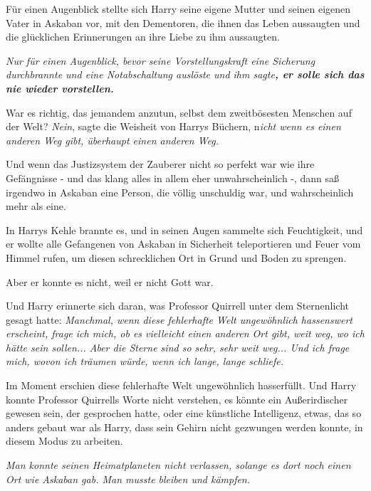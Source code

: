 Für einen Augenblick stellte sich Harry seine eigene Mutter und seinen eigenen
Vater in Askaban vor, mit den Dementoren, die ihnen das Leben aussaugten und die
glücklichen Erinnerungen an ihre Liebe zu ihm aussaugten.

\textbf{} \emph{Nur für einen Augenblick, bevor seine Vorstellungskraft eine
Sicherung durchbrannte und eine Notabschaltung auslöste und ihm
sagte}\textbf{\emph{, er solle sich das nie wieder vorstellen.}}

War es richtig, das jemandem anzutun, selbst dem zweitbösesten Menschen auf der
Welt? \emph{Nein}, sagte die Weisheit von Harrys Büchern, n\emph{icht wenn es
einen anderen Weg gibt, überhaupt einen anderen Weg.}

Und wenn das Justizsystem der Zauberer nicht so perfekt war wie ihre Gefängnisse
- und das klang alles in allem eher unwahrscheinlich -, dann saß irgendwo in
Askaban eine Person, die völlig unschuldig war, und wahrscheinlich mehr als
eine.

In Harrys Kehle brannte es, und in seinen Augen sammelte sich Feuchtigkeit, und
er wollte alle Gefangenen von Askaban in Sicherheit teleportieren und Feuer vom
Himmel rufen, um diesen schrecklichen Ort in Grund und Boden zu sprengen.

Aber er konnte es nicht, weil er nicht Gott war.

Und Harry erinnerte sich daran, was Professor Quirrell unter dem Sternenlicht
gesagt hatte: \emph{Manchmal, wenn diese fehlerhafte Welt ungewöhnlich
hassenswert erscheint, frage ich mich, ob es vielleicht einen anderen Ort gibt,
weit weg, wo ich hätte sein sollen... Aber die Sterne sind so sehr, sehr weit
weg... Und ich frage mich, wovon ich träumen würde, wenn ich lange, lange
schliefe.}

Im Moment erschien diese fehlerhafte Welt ungewöhnlich hasserfüllt. Und Harry
konnte Professor Quirrells Worte nicht verstehen, es könnte ein Außerirdischer
gewesen sein, der gesprochen hatte, oder eine künstliche Intelligenz, etwas, das
so anders gebaut war als Harry, dass sein Gehirn nicht gezwungen werden konnte,
in diesem Modus zu arbeiten.

\emph{Man konnte seinen Heimatplaneten nicht verlassen, solange es dort noch
einen Ort wie Askaban gab. Man musste bleiben und kämpfen.}

